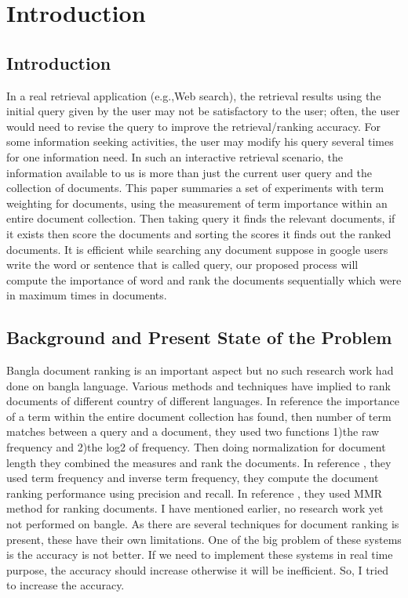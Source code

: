 \chapter{Introduction}
\label{Ch_Chapter1}

\section{Introduction}

In a real retrieval application (e.g.,Web search), the retrieval results using the initial query given by the user may not be satisfactory to the user; often, the user would need to revise the query to improve the retrieval/ranking accuracy. For some information seeking activities, the user may modify his query several times for one information need. In such an interactive retrieval scenario, the information available to us is more than just the current user query and the collection of documents. This paper summaries a set of experiments with term weighting for documents, using the measurement of term importance within an entire document collection. Then taking query it finds the relevant documents, if it exists then score the documents and sorting the scores it finds out the ranked documents. It is efficient while searching any document suppose in google users write the word or sentence that is called query, our proposed process will compute the importance of  word and rank the documents sequentially which were in maximum times in documents.

\section{Background and Present State of the Problem}

Bangla document ranking is an important aspect but no such research work had done on bangla language. Various methods and techniques have implied to rank documents of different country of different languages. In reference \cite{harman1986experimental} the importance of a term within the entire document collection has found, then number of term matches between a query and a document, they used two functions 1)the raw frequency and 2)the  log2  of frequency. Then doing normalization for document length they combined the measures and rank the documents. In reference \cite{lee1997document}, they used term frequency and inverse term frequency, they compute the document ranking performance using precision and recall. In reference \cite{carbonell1998use}, they used MMR method for ranking documents.
I have mentioned earlier, no research work yet not performed on bangle.  As there are several techniques for document ranking is present, these have their own limitations. One of the big problem of these systems is the accuracy is 	not better. If we need to implement these systems in real time purpose, the accuracy should increase otherwise it will be inefficient. So, I tried to increase the accuracy.

